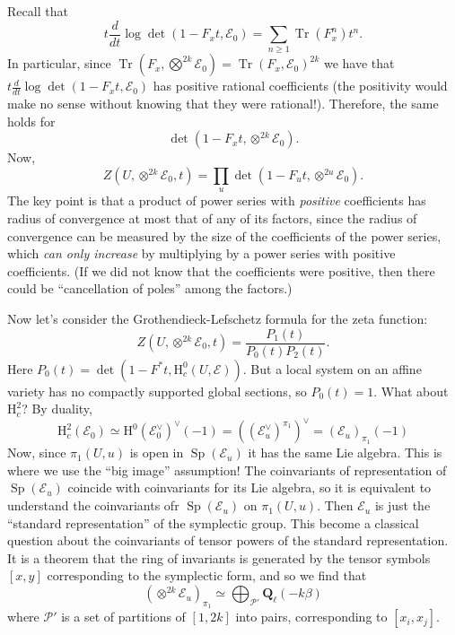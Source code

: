 \documentclass[letterpaper,11pt]{article}
\DeclareMathOperator{\Tr}{Tr}
\newcommand{\Q}{\mathbf{Q}}
\newcommand{\Cal}[1]{\mathcal{#1}}
\newcommand{\mrm}[1]{\mathrm{#1}}
\DeclareMathOperator{\Sp}{Sp}
\begin{document}
Recall that 
\[
t \frac{d}{dt} \log \det (1-F_x t, \Cal{E}_0) = \sum_{n \geq 1} \Tr(F_x^n) t^n.
\]
In particular, since $\Tr(F_x, \bigotimes^{2k} \Cal{E}_0) = \Tr(F_x, \Cal{E}_0)^{2k}$ we have that $t \frac{d}{dt} \log \det (1-F_x t, \Cal{E}_0) $ has positive rational coefficients (the positivity would make no sense without knowing that they were rational!). Therefore, the same holds for 
\[
\det (1-F_x t, \otimes^{2k} \Cal{E}_0) .
\]
Now, 
\[
Z(U, \otimes^{2k} \Cal{E}_0, t) = \prod_u \det (1-F_u t, \otimes^{2u} \Cal{E}_0).
\]
The key point is that a product of power series with \emph{positive} coefficients has radius of convergence at most that of any of its factors, since the radius of convergence can be measured by the size of the coefficients of the power series, which \emph{can only increase} by multiplying by a power series with positive coefficients. (If we did not know that the coefficients were positive, then there could be ``cancellation of poles'' among the factors.) 

Now let's consider the Grothendieck-Lefschetz formula for the zeta function:
\[
Z(U, \otimes^{2k} \Cal{E}_0, t) = \frac{P_1(t)}{P_0(t) P_2(t)}.
\]
Here $P_0(t) = \det(1-F^* t , \mrm{H}_c^0(U, \Cal{E}))$. But a local system on an affine variety has no compactly supported global sections, so $P_0(t)=1$. What about $\mrm{H}_c^2$? By duality, 
\[
\mrm{H}_c^2 (\Cal{E}_0) \simeq \mrm{H}^0(\Cal{E}_0^{\vee})^{\vee}(-1)  = ((\Cal{E}_u^{\vee})^{\pi_1})^{\vee} = (\Cal{E}_u)_{\pi_1}(-1)
\]
Now, since $\pi_1(U, u)$ is open in $\Sp(\Cal{E}_u)$ it has the same Lie algebra. This is where we use the ``big image'' assumption! The coinvariants of representation of $\Sp(\Cal{E}_u)$ coincide with coinvariants for its Lie algebra, so it is equivalent to understand the coinvariants ofr $\Sp(\Cal{E}_u)$ on $\pi_1(U,u)$.  Then $\Cal{E}_u$ is just the ``standard representation'' of the symplectic group. This become a classical question about the coinvariants of tensor powers of the standard representation. It is a theorem that the ring of invariants is generated by the tensor symbols $[x,y]$ corresponding to the symplectic form, and so we find that 
\[
\left( \otimes^{2k} \Cal{E}_u \right)_{\pi_1} \simeq \bigoplus_{\Cal{P}'} \Q_{\ell}(-k\beta)
\]
where $\Cal{P}'$ is a set of partitions of $[1,2k]$ into pairs, corresponding to $[x_i,x_j]$. 
\end{document}
